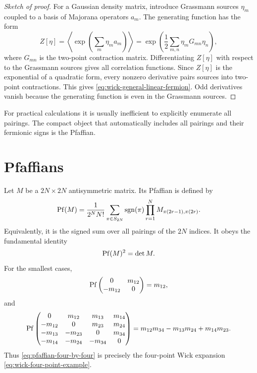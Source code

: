 \begin{proof}[Sketch of proof]
For a Gaussian density matrix, introduce Grassmann sources $\eta_m$ coupled to a
basis of Majorana operators $a_m$.  The generating function has the form
\begin{equation}
    Z[\eta]
    =\left\langle
    \exp\left(\sum_m\eta_ma_m\right)
    \right\rangle
    =\exp\left(\frac12\sum_{m,n}\eta_mG_{mn}\eta_n\right),
\end{equation}
where $G_{mn}$ is the two-point contraction matrix.  Differentiating $Z[\eta]$
with respect to the Grassmann sources gives all correlation functions.  Since
$Z[\eta]$ is the exponential of a quadratic form, every nonzero derivative pairs
sources into two-point contractions.  This gives \cref{eq:wick-general-linear-fermion}.
Odd derivatives vanish because the generating function is even in the Grassmann
sources.
\end{proof}

For practical calculations it is usually inefficient to explicitly enumerate all
pairings.  The compact object that automatically includes all pairings and their
fermionic signs is the Pfaffian.

\section{Pfaffians}
\label{sec:pfaffians-basic-definition}

Let $M$ be a $2N\times2N$ antisymmetric matrix.  Its Pfaffian is defined by
\begin{equation}
\label{eq:pfaffian-definition}
    \operatorname{Pf}(M)
    =
    \frac{1}{2^N N!}
    \sum_{\pi\in S_{2N}}
    \operatorname{sgn}(\pi)
    \prod_{r=1}^{N}
    M_{\pi(2r-1),\pi(2r)} .
\end{equation}
Equivalently, it is the signed sum over all pairings of the $2N$ indices.
It obeys the fundamental identity
\begin{equation}
\label{eq:pfaffian-determinant-identity}
    \operatorname{Pf}(M)^2=\det M .
\end{equation}
For the smallest cases,
\begin{equation}
    \operatorname{Pf}
    \begin{pmatrix}
        0&m_{12}\\
        -m_{12}&0
    \end{pmatrix}
    =m_{12},
\end{equation}
and
\begin{equation}
\label{eq:pfaffian-four-by-four}
    \operatorname{Pf}
    \begin{pmatrix}
        0&m_{12}&m_{13}&m_{14}\\
        -m_{12}&0&m_{23}&m_{24}\\
        -m_{13}&-m_{23}&0&m_{34}\\
        -m_{14}&-m_{24}&-m_{34}&0
    \end{pmatrix}
    =m_{12}m_{34}-m_{13}m_{24}+m_{14}m_{23}.
\end{equation}
Thus \cref{eq:pfaffian-four-by-four} is precisely the four-point Wick expansion
\cref{eq:wick-four-point-example}.

